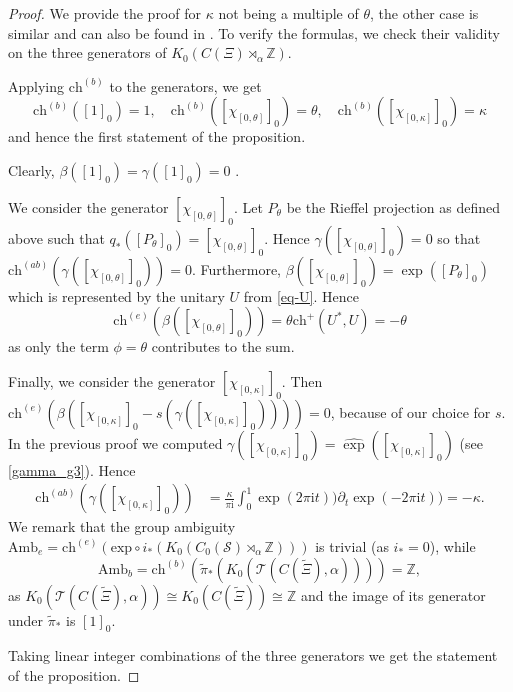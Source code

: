 \documentclass[11pt]{amsart}
\newcommand{\Z}{\mathbb{Z}}
\newcommand{\cut}{\kappa}
\newcommand{\ch}{\text{ch}}
\newcommand{\chb}{\text{ch}^{(b)}}
\newcommand{\che}{\text{ch}^{(e)}}
\newcommand{\chab}{\text{ch}^{(ab)}}
\begin{document}
\begin{proof} We provide the proof for $\cut$ not being a multiple of $\theta$, the other case is similar and can also be found in \cite{kellendonk_prodan}. 
	To verify the formulas, we check their validity on the three generators of $K_0(C(\Xi) \rtimes_\alpha \mathbb{Z})$. 
	
	Applying $\chb$ to the generators, we get
	$$\chb([1]_0)=1,\quad \chb([\chi_{[0, \theta]}]_0)=\theta,\quad \chb([\chi_{[0, \cut]}]_0)=\cut$$
	and hence the first statement of the proposition. 
	
	Clearly, $\beta([1]_0)=\gamma([1]_0) = 0$ .
	
	We consider the generator $[\chi_{[0, \theta]}]_0$. Let $P_\theta$ be the Rieffel projection as defined above such that $q_*([P_\theta]_0)=[\chi_{[0, \theta]}]_0$. Hence $\gamma([\chi_{[0, \theta]}]_0)=0$ so that $\chab(\gamma([\chi_{[0, \theta]}]_0))=0$. Furthermore, $\beta([\chi_{[0, \theta]}]_0)=\exp ([P_\theta]_0)$ which is represented by the unitary $U$ from \eqref{eq-U}. Hence
$$\che(\beta([\chi_{[0, \theta]}]_0)) =\theta \ch^{+}(U^* , U) = -\theta $$	
as only the term $\phi = \theta$ contributes to the sum.	

	Finally, we consider  the generator $[\chi_{[0, \cut]}]_0$. Then $\che(\beta([\chi_{[0, \cut]}]_0-s(\gamma([\chi_{[0, \cut]}]_0))))=0$, because of our choice for $s$. In the previous proof we computed 
	$\gamma([\chi_{[0 ,\cut]}]_0)=\hat\exp([{\chi}_{[0, \cut]}]_0)$ (see \eqref{gamma_g3}).
	Hence 
	\begin{align*}
		\chab(\gamma([\chi_{[0 ,\cut]}]_0))& =\frac{\kappa}{\pi\mathrm{i}}
		\int_0^1 \exp(2\pi\mathrm{i}t))\partial_t\exp(-2\pi\mathrm{i}t)) =-\kappa.
	\end{align*}
	We remark that the group ambiguity $\mathrm{Amb}_e=\che(\mathrm{exp}\circ i_*(K_0(C_0(\mathcal{S}) \rtimes_\alpha \mathbb{Z})))$ is trivial (as $i_*=0$), 
	while $$\mathrm{Amb}_b=\chb(\tilde{\pi}_*(K_0(\mathcal{T}(C(\tilde{\Xi}), \alpha))))=\Z,$$ 
	as 
	$K_0(\mathcal{T}(C(\tilde{\Xi}), \alpha))\cong K_0(C(\tilde{\Xi}))\cong \Z$
	and the image of its generator under $\tilde\pi_*$ is $[1]_0$.
	
	Taking linear integer combinations of the three generators we get the statement of the proposition.
\end{proof}
\end{document}
